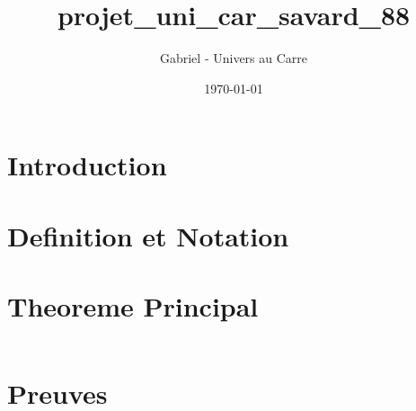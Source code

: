 \documentclass[12pt]{article}
\title{projet_uni_car_savard_88}
\author{Gabriel - Univers au Carre}
\date{\today}
\begin{document}
\maketitle


\section{Introduction}



\section{Definition et Notation}



\section{Theoreme Principal}


\begin{equation}
\end{equation}


\section{Preuves}


\end{document}
